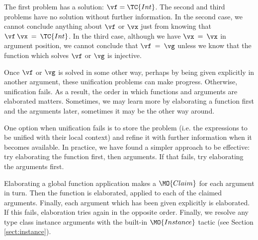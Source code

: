 
The first problem has a solution: $\vf=\TC{Int}$. The second and third problems have
no solution without further information. In the second case, we cannot conclude 
anything about $\vf$ or $\vx$ just from knowing that $\vf\:\vx\:=\:\TC{Int}$.
In the third case, although we have $\vx\:=\:\vx$ in argument position, we cannot
conclude that $\vf\:=\:\vg$ unless we know that the function which solves $\vf$ or
$\vg$ is injective.

Once $\vf$ or $\vg$ is solved in some other way, perhaps by being given explicitly
in another argument, these unification problems can make progress. Otherwise, unification
fails. As a result, the order in which functions and arguments are
elaborated matters. Sometimes, we may learn more by elaborating a function first
and the arguments later, sometimes it may be the other way around. 

One option when unification fails is to store the problem (i.e. the expressions to be
unified with their local context) and refine it with further information when it becomes 
available. In practice, we have found a simpler approach to be effective: try
elaborating the function first, then arguments. If that fails, try elaborating the
arguments first.

Elaborating a global function application makes a $\MO{Claim}$ for each argument
in turn. Then the function is elaborated, applied to each of the claimed arguments.
Finally, each argument which has been given explicitly is elaborated. If this fails,
elaboration tries again in the opposite order. Finally, we resolve any type
class instance arguments with the built-in $\MO{Instance}$ tactic (see Section
\ref{sect:instance}).


